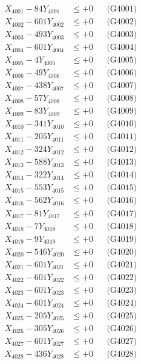 \documentclass[a4paper,10pt]{article}
\begin{document}
{\begin{align}
\allowbreak
X_{4001} - 84Y_{4001} &\leq +0 && \text{(G4001)} \\
X_{4002} - 601Y_{4002} &\leq +0 && \text{(G4002)} \\
X_{4003} - 493Y_{4003} &\leq +0 && \text{(G4003)} \\
X_{4004} - 601Y_{4004} &\leq +0 && \text{(G4004)} \\
X_{4005} - 4Y_{4005} &\leq +0 && \text{(G4005)} \\
X_{4006} - 49Y_{4006} &\leq +0 && \text{(G4006)} \\
X_{4007} - 438Y_{4007} &\leq +0 && \text{(G4007)} \\
X_{4008} - 57Y_{4008} &\leq +0 && \text{(G4008)} \\
X_{4009} - 83Y_{4009} &\leq +0 && \text{(G4009)} \\
X_{4010} - 341Y_{4010} &\leq +0 && \text{(G4010)} \\
\allowbreak
X_{4011} - 205Y_{4011} &\leq +0 && \text{(G4011)} \\
X_{4012} - 324Y_{4012} &\leq +0 && \text{(G4012)} \\
X_{4013} - 588Y_{4013} &\leq +0 && \text{(G4013)} \\
X_{4014} - 322Y_{4014} &\leq +0 && \text{(G4014)} \\
X_{4015} - 553Y_{4015} &\leq +0 && \text{(G4015)} \\
X_{4016} - 562Y_{4016} &\leq +0 && \text{(G4016)} \\
X_{4017} - 81Y_{4017} &\leq +0 && \text{(G4017)} \\
X_{4018} - 7Y_{4018} &\leq +0 && \text{(G4018)} \\
X_{4019} - 9Y_{4019} &\leq +0 && \text{(G4019)} \\
X_{4020} - 546Y_{4020} &\leq +0 && \text{(G4020)} \\
\allowbreak
X_{4021} - 601Y_{4021} &\leq +0 && \text{(G4021)} \\
X_{4022} - 601Y_{4022} &\leq +0 && \text{(G4022)} \\
X_{4023} - 601Y_{4023} &\leq +0 && \text{(G4023)} \\
X_{4024} - 601Y_{4024} &\leq +0 && \text{(G4024)} \\
X_{4025} - 205Y_{4025} &\leq +0 && \text{(G4025)} \\
X_{4026} - 305Y_{4026} &\leq +0 && \text{(G4026)} \\
X_{4027} - 601Y_{4027} &\leq +0 && \text{(G4027)} \\
X_{4028} - 436Y_{4028} &\leq +0 && \text{(G4028)} \\

\end{align}}
\end{document}
